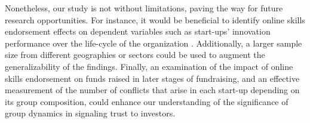 \documentclass[12pt]{article}
\begin{document}
Nonetheless, our study is not without limitations, paving the way for future research opportunities. For instance, it would be beneficial to identify online skills endorsement effects on dependent variables such as start-ups' innovation performance over the life-cycle of the organization \citep{knight2020start}. Additionally, a larger sample size from different geographies or sectors could be used to augment the generalizability of the findings. Finally, an examination of the impact of online skills endorsement on funds raised in later stages of fundraising, and an effective measurement of the number of conflicts that arise in each start-up depending on its group composition, could enhance our understanding of the significance of group dynamics in signaling trust to investors.




\end{document}
